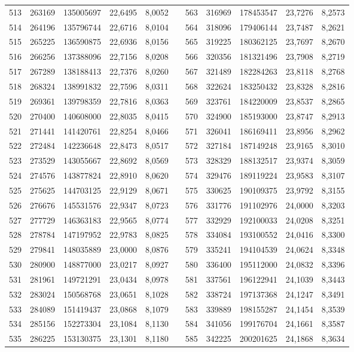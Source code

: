\begin{longtable}{rrrrrrrrrrr}
513&263169&135005697&22,6495&8,0052&&563&316969&178453547&23,7276&8,2573\\
514&264196&135796744&22,6716&8,0104&&564&318096&179406144&23,7487&8,2621\\
515&265225&136590875&22,6936&8,0156&&565&319225&180362125&23,7697&8,2670\\
516&266256&137388096&22,7156&8,0208&&566&320356&181321496&23,7908&8,2719\\
517&267289&138188413&22,7376&8,0260&&567&321489&182284263&23,8118&8,2768\\
518&268324&138991832&22,7596&8,0311&&568&322624&183250432&23,8328&8,2816\\
519&269361&139798359&22,7816&8,0363&&569&323761&184220009&23,8537&8,2865\\
520&270400&140608000&22,8035&8,0415&&570&324900&185193000&23,8747&8,2913\\
521&271441&141420761&22,8254&8,0466&&571&326041&186169411&23,8956&8,2962\\
522&272484&142236648&22,8473&8,0517&&572&327184&187149248&23,9165&8,3010\\
523&273529&143055667&22,8692&8,0569&&573&328329&188132517&23,9374&8,3059\\
524&274576&143877824&22,8910&8,0620&&574&329476&189119224&23,9583&8,3107\\
525&275625&144703125&22,9129&8,0671&&575&330625&190109375&23,9792&8,3155\\
526&276676&145531576&22,9347&8,0723&&576&331776&191102976&24,0000&8,3203\\
527&277729&146363183&22,9565&8,0774&&577&332929&192100033&24,0208&8,3251\\
528&278784&147197952&22,9783&8,0825&&578&334084&193100552&24,0416&8,3300\\
529&279841&148035889&23,0000&8,0876&&579&335241&194104539&24,0624&8,3348\\
530&280900&148877000&23,0217&8,0927&&580&336400&195112000&24,0832&8,3396\\
531&281961&149721291&23,0434&8,0978&&581&337561&196122941&24,1039&8,3443\\
532&283024&150568768&23,0651&8,1028&&582&338724&197137368&24,1247&8,3491\\
533&284089&151419437&23,0868&8,1079&&583&339889&198155287&24,1454&8,3539\\
534&285156&152273304&23,1084&8,1130&&584&341056&199176704&24,1661&8,3587\\
535&286225&153130375&23,1301&8,1180&&585&342225&200201625&24,1868&8,3634\\

\end{longtable}

